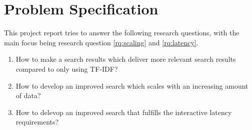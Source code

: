 \section{Problem Specification}
\label{sec:problem-specification}
This project report tries to answer the following research questions, with the main focus being research question \ref{rq:scaling} and \ref{rq:latency}.

\begin{enumerate}
  \item How to make a search results which deliver more relevant search results compared to only using TF-IDF?
  \item\label{rq:scaling} How to develop an improved search which scales with an increasing amount of data?
  \item\label{rq:latency} How to delevop an improved search that fulfills the interactive latency requirements?
\end{enumerate}
